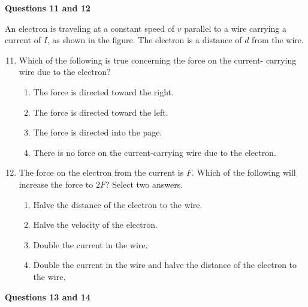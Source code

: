 \documentclass[11pt]{article}
\begin{document}
\begin{multicols}{2}
  \columnbreak

  \textbf{Questions 11 and 12}

  An electron is traveling at a constant speed of $v$ parallel to a wire
  carrying a current of $I$, as shown in the figure. The electron is a distance
  of $d$ from the wire.
  \begin{center}
  \end{center}
  
  \begin{enumerate}[leftmargin=18pt]
    \setcounter{enumi}{10}
  \item Which of the following is true concerning the force on the current-
    carrying wire due to the electron?
    \begin{enumerate}[noitemsep,topsep=0pt,leftmargin=18pt,label=(\Alph*)]
    \item The force is directed toward the right.
    \item The force is directed toward the left.
    \item The force is directed into the page.
    \item There is no force on the current-carrying wire due to the electron.
    \end{enumerate}

  \item The force on the electron from the current is $F$. Which of the
    following will increase the force to $2F$? Select two answers.
    \begin{enumerate}[noitemsep,topsep=0pt,leftmargin=18pt,label=(\Alph*)]
    \item Halve the distance of the electron to the wire.
    \item Halve the velocity of the electron.
    \item Double the current in the wire.
    \item Double the current in the wire and halve the distance of the electron
      to the wire.
    \end{enumerate}
  \end{enumerate}

  \columnbreak

  \textbf{Questions 13 and 14}


\end{multicols}
\end{document}
